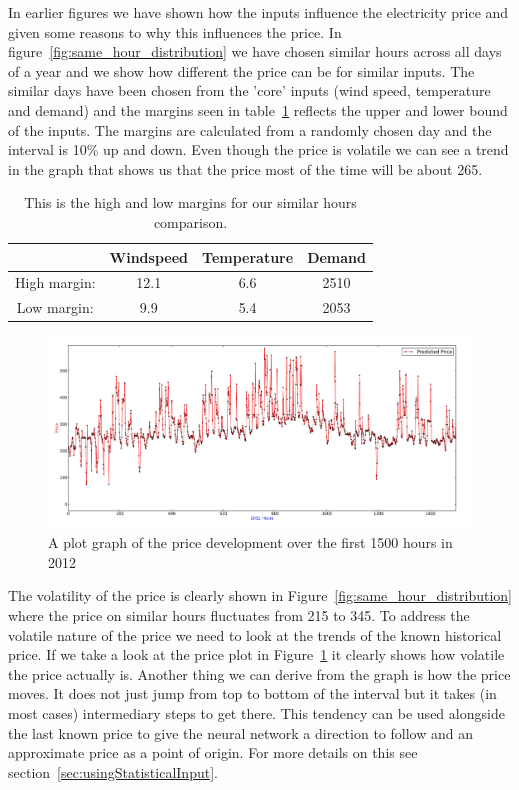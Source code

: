 In earlier figures we have shown how the inputs influence the electricity price and given some reasons to why this influences the price. In figure~\ref{fig:same_hour_distribution} we have chosen similar hours across all days of a year and we show how different the price can be for similar inputs. The similar days have been chosen from the 'core' inputs (wind speed, temperature and demand) and the margins seen in table~\ref{table:similarHoursLimits} reflects the upper and lower bound of the inputs. The margins are calculated from a randomly chosen day and the interval is 10\% up and down. Even though the price is volatile we can see a trend in the graph that shows us that the price most of the time will be about 265.

\begin{table}[H]
\centering  %
\begin{tabular}{|c|c|c|c|} %
	\hline
 & Windspeed & Temperature & Demand \\ [0.5ex] %
\hline                  %
High margin: & 12.1 & 6.6 & 2510  \\ \hline
Low margin: & 9.9 & 5.4 & 2053 \\  \hline
\end{tabular}
\caption{This is the high and low margins for our similar hours comparison.} %
\label{table:similarHoursLimits} %
\end{table}

\begin{figure}[H]
\centering
\includegraphics[width=\textwidth ]{billeder/energy_price_plots/plotGraph.jpg}
\caption{A plot graph of the price development over the first 1500 hours in 2012}
\label{fig:plotGraph}
\end{figure}

The volatility of the price is clearly shown in Figure~\ref{fig:same_hour_distribution} where the price on similar hours fluctuates from 215 to 345. To address the volatile nature of the price we need to look at the trends of the known historical price. If we take a look at the price plot in Figure~\ref{fig:plotGraph} it clearly shows how volatile the price actually is. Another thing we can derive from the graph is how the price moves. It does not just jump from top to bottom of the interval but it takes (in most cases) intermediary steps to get there. This tendency can be used alongside the last known price to give the neural network a direction to follow and an approximate price as a point of origin. For more details on this see section~\ref{sec:usingStatisticalInput}.

